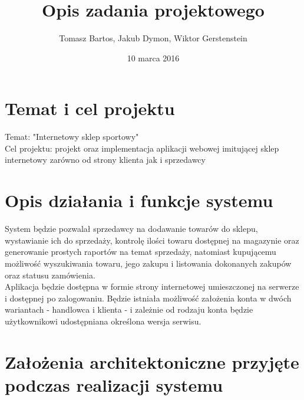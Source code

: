 \documentclass[a4paper, 11pt]{article}
\title{Opis zadania projektowego}
\author{Tomasz Bartos, Jakub Dymon, Wiktor Gerstenstein}
\date{10 marca 2016}
\begin{document}
\maketitle
\section{Temat i cel projektu}
Temat: "Internetowy sklep sportowy"\\
Cel projektu: projekt oraz implementacja aplikacji webowej imitującej sklep internetowy zarówno od strony klienta jak i sprzedawcy
\section{Opis działania i funkcje systemu}
System będzie pozwalał sprzedawcy na dodawanie towarów do sklepu, wystawianie ich do sprzedaży, kontrolę ilości towaru dostępnej na magazynie oraz generowanie prostych raportów na temat sprzedaży, natomiast kupującemu możliwość wyszukiwania towaru, jego zakupu i listowania dokonanych zakupów oraz statusu zamówienia.\\
Aplikacja będzie dostępna w formie strony internetowej umieszczonej na serwerze i dostępnej po zalogowaniu. Będzie istniała możliwość założenia konta w dwóch wariantach - handlowca i klienta - i zależnie od rodzaju konta będzie użytkownikowi udostępniana określona wersja serwisu.
\section{Założenia architektoniczne przyjęte podczas realizacji systemu}
\end{document}
